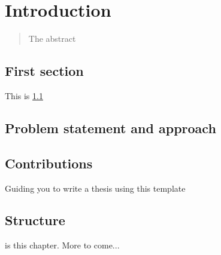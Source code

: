 \chapter{Introduction}
\label{c:introduction}

\begin{abstract}%
    The abstract
\end{abstract}

\section{First section}
\label{s:intro:first}

This is \cref{s:intro:first}

\section{Problem statement and approach}
\label{s:intro:problem}

\chapdef{}%
\begin{emphasize}
	\theproblem
\end{emphasize}

\section{Contributions}
Guiding you to write a thesis using this template

\section{Structure}

 is this chapter. More to come...
